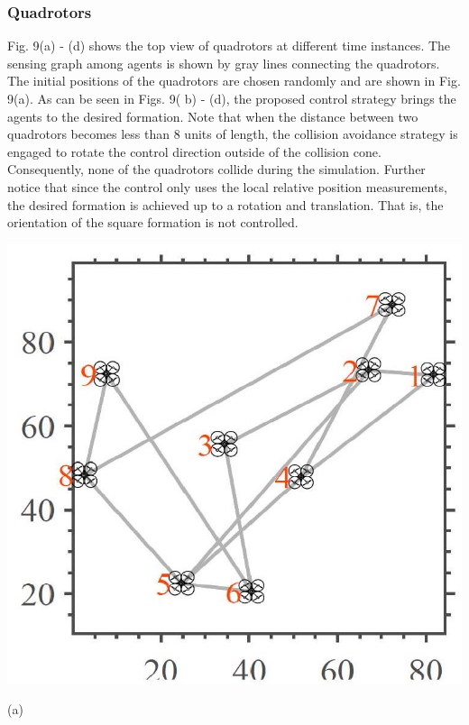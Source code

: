 \documentclass[10pt]{article}
\begin{document}
\subsubsection{Quadrotors}
Fig. 9(a) - (d) shows the top view of quadrotors at different time instances. The sensing graph among agents is shown by gray lines connecting the quadrotors. The initial positions of the quadrotors are chosen randomly and are shown in Fig. 9(a). As can be seen in Figs. 9( b) - (d), the proposed control strategy brings the agents to the desired formation. Note that when the distance between two quadrotors becomes less than 8 units of length, the collision avoidance strategy is engaged to rotate the control direction outside of the collision cone. Consequently, none of the quadrotors collide during the simulation. Further notice that since the control only uses the local relative position measurements, the desired formation is achieved up to a rotation and translation. That is, the orientation of the square formation is not controlled.

\begin{center}
\includegraphics[max width=\textwidth]{2023_10_07_53b70c7408bc8e139415g-50(1)}
\end{center}

(a)
\end{document}

